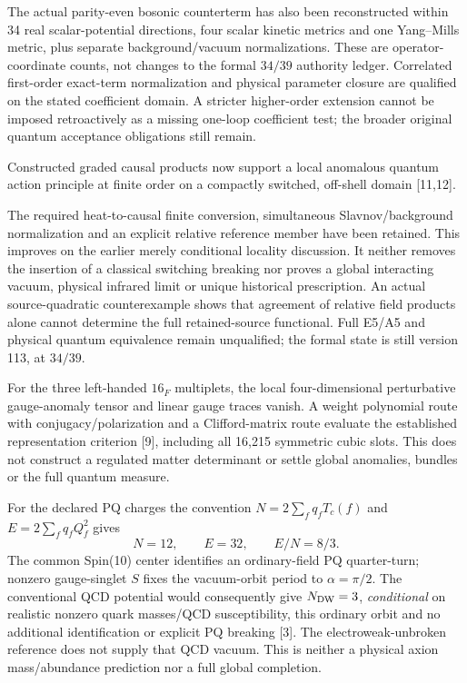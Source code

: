 \documentclass[10pt,letterpaper]{article}
\newcommand{\sect}[1]{\vspace{5pt}{\large\bfseries\color{ink}#1}\par}
\begin{document}
The actual parity-even bosonic counterterm has also been reconstructed within
34 real scalar-potential directions, four scalar kinetic metrics and one
Yang--Mills metric, plus separate background/vacuum normalizations. These are
operator-coordinate counts, not changes to the formal $34/39$ authority ledger.
Correlated first-order exact-term normalization and physical parameter closure
are qualified on the stated coefficient domain. A stricter higher-order
extension cannot be imposed retroactively as a missing one-loop coefficient
test; the broader original quantum acceptance obligations still remain.

Constructed graded causal products now support a local anomalous quantum
action principle at finite order on a compactly switched, off-shell
domain [11,12].

The required heat-to-causal finite conversion, simultaneous Slavnov/background
normalization and an explicit relative reference member have been retained.
This improves on the earlier merely conditional locality discussion.
It neither removes the insertion of a classical switching breaking nor proves
a global interacting vacuum, physical infrared limit or unique historical
prescription. An actual source-quadratic counterexample shows that agreement
of relative field products alone cannot determine the full retained-source
functional. Full E5/A5 and physical quantum equivalence remain unqualified;
the formal state is still version 113, at $34/39$.

\sect{Gauge anomaly and PQ structure}
For the three left-handed $16_F$ multiplets, the local four-dimensional
perturbative gauge-anomaly tensor and linear gauge traces vanish. A weight
polynomial route with conjugacy/polarization and a Clifford-matrix route
evaluate the established representation criterion [9], including all 16,215
symmetric cubic slots. This does not construct a regulated matter determinant
or settle global anomalies, bundles or the full quantum measure.

For the declared PQ charges the convention $N=2\sum_f q_f T_c(f)$ and
$E=2\sum_f q_f Q_f^2$ gives
\[
N=12,\qquad E=32,\qquad E/N=8/3.
\]
The common Spin(10) center identifies an ordinary-field PQ quarter-turn;
nonzero gauge-singlet $S$ fixes the vacuum-orbit period to $\alpha=\pi/2$.
The conventional QCD potential would consequently give $N_{\rm DW}=3$,
\emph{conditional} on realistic nonzero quark masses/QCD susceptibility, this
ordinary orbit and no additional identification or explicit PQ breaking [3].
The electroweak-unbroken reference does not supply that QCD vacuum. This is
neither a physical axion mass/abundance prediction nor a full global completion.
\end{document}
